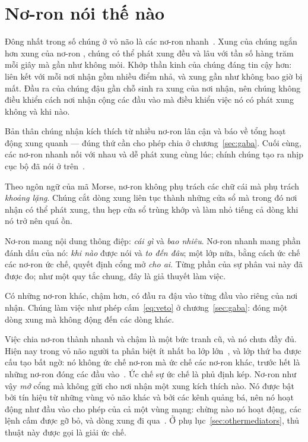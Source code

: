 \section{Nơ-ron  nói thế nào}

Đông nhất trong số chúng ở vỏ não là các nơ-ron nhanh~\cite{Tremblay2016}. Xung của chúng ngắn hơn xung của nơ-ron , chúng có thể phát xung đều và lâu với tần số hàng trăm mỗi giây mà gần như không mỏi. Khớp thần kinh của chúng đáng tin cậy hơn: liên kết với mỗi nơi nhận gồm nhiều điểm nhả, và xung gần như không bao giờ bị mất. Đầu ra của chúng đậu gần chỗ sinh ra xung của nơi nhận, nên chúng không điều khiển cách nơi nhận cộng các đầu vào mà điều khiển việc nó có phát xung không và khi nào.

Bản thân chúng nhận kích thích từ nhiều nơ-ron  lân cận và báo về tổng hoạt động xung quanh --- đúng thứ cần cho phép chia ở chương~\ref{sec:gaba}. Cuối cùng, các nơ-ron  nhanh nối với nhau và dễ phát xung cùng lúc; chính chúng tạo ra nhịp cục bộ đã nói ở trên~\cite{Cardin2009}.

Theo ngôn ngữ của mã Morse, nơ-ron  không phụ trách các chữ cái mà phụ trách \emph{khoảng lặng}. Chúng cắt dòng xung  liên tục thành những cửa sổ mà trong đó nơi nhận có thể phát xung, thu hẹp cửa sổ trùng khớp và làm nhỏ tiếng cả dòng khi nó trở nên quá ồn.

\begin{keyblock}
\begin{proposition}
\label{prop:punctuation}
Nơ-ron  mang nội dung thông điệp: \emph{cái gì} và \emph{bao nhiêu}. Nơ-ron  nhanh mang phần đánh dấu của nó: \emph{khi nào} được nói và \emph{to đến đâu}; một lớp nữa, bằng cách ức chế các nơ-ron ức chế, quyết định cổng mở \emph{cho ai}. Từng phần của sự phân vai này đã được đo; như một quy tắc chung, đây là giả thuyết làm việc.
\end{proposition}
\end{keyblock}

Có những nơ-ron  khác, chậm hơn, có đầu ra đậu vào từng đầu vào riêng của nơi nhận. Chúng làm việc như phép cấm~\eqref{eq:veto} ở chương~\ref{sec:gaba}: đóng một dòng xung  mà không động đến các dòng khác.

Việc chia nơ-ron  thành nhanh và chậm là một bức tranh cũ, và nó chưa đầy đủ. Hiện nay trong vỏ não người ta phân biệt ít nhất ba lớp lớn~\cite{Tremblay2016}, và lớp thứ ba được cấu tạo bất ngờ: nó không ức chế nơ-ron  mà ức chế các nơ-ron  khác, trước hết là những nơ-ron đóng các đầu vào~\cite{Pfeffer2013}. Ức chế sự ức chế là phủ định kép. Nơ-ron như vậy \emph{mở} cổng mà không gửi cho nơi nhận một xung kích thích nào. Nó được bật bởi tín hiệu từ những vùng vỏ não khác và bởi các kênh quảng bá, nên nó hoạt động như đầu vào cho phép của cả một vùng mạng: chừng nào nó hoạt động, các lệnh cấm được gỡ bỏ, và dòng xung đi qua~\cite{Pi2013}. Ở phụ lục~\ref{sec:othermediators}, thủ thuật này được gọi là giải ức chế.
